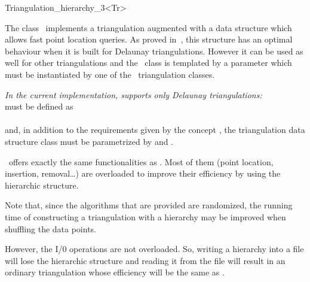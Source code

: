 

\begin{ccRefClass}{Triangulation_hierarchy_3<Tr>}

\ccDefinition
The class \ccRefName\ implements a triangulation augmented with
a data structure which allows fast point location queries.
As proved in~\cite{d-iirdt-98}, this structure has an optimal behaviour
when it is built for Delaunay triangulations.
However it can be used as well for other triangulations
and the \ccRefName\ class is templated by a parameter
which must be instantiated by one of the \cgal\ triangulation
classes.

\textit{In the current implementation,  
supports only Delaunay triangulations:}\\
 must be defined as\\
\\
and, in addition to the requirements given by the concept
, the triangulation data structure
class must be parametrized by 
and .


\ccInheritsFrom


\ccRefName\ offers exactly the same functionalities as .
Most of them (point location, insertion, removal\ldots) are overloaded to
improve their efficiency by using the hierarchic structure. 

Note that, since the algorithms that are provided are randomized, the
running time of constructing a triangulation with a hierarchy may be
improved when shuffling the data points.

However, the I/0 operations are not overloaded. So, writing a
hierarchy into a file will lose the hierarchic structure and reading
it from the file will result in an ordinary triangulation whose
efficiency will be the same as .


\end{ccRefClass}

